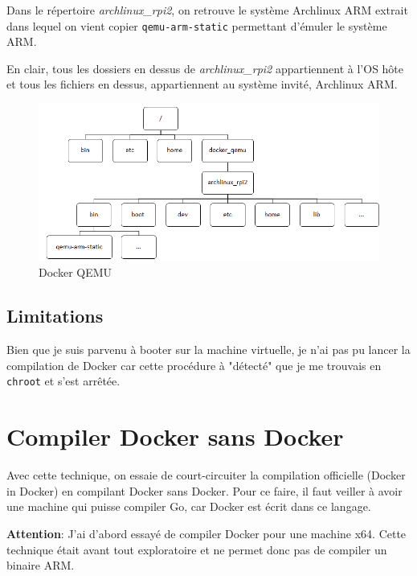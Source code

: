 \documentclass[11pt,a4paper,oneside]{report}
\newcommand{\code}[1]{\texttt{#1}} %
\begin{document}
Dans le répertoire \textit{archlinux\_rpi2}, on retrouve le système Archlinux ARM extrait dans lequel on vient copier \code{qemu-arm-static} permettant d'émuler le système ARM.

En clair, tous les dossiers en dessus de \textit{archlinux\_rpi2} appartiennent à l'OS hôte et tous les fichiers en dessus, appartiennent au système invité, Archlinux ARM.

\begin{figure}
\begin{center}
        \includegraphics[scale=0.75]{img/chroot_archlinux_rpi}
        \caption{Docker QEMU}
        \label{fig_chroot_qemu}
    \end{center}
\end{figure}


\subsection{Limitations}

Bien que je suis parvenu à booter sur la machine virtuelle, je n'ai pas pu lancer la compilation de Docker car cette procédure à "détecté" que je me trouvais en \code{chroot} et s'est arrêtée.

\section{Compiler Docker sans Docker}

Avec cette technique, on essaie de court-circuiter la compilation officielle (Docker in Docker) en compilant Docker sans Docker. Pour ce faire, il faut veiller à avoir une machine qui puisse compiler Go, car Docker est écrit dans ce langage.

\textbf{Attention}: J'ai d'abord essayé de compiler Docker pour une machine x64. Cette technique était avant tout exploratoire et ne permet donc pas de compiler un binaire ARM.
\end{document}
